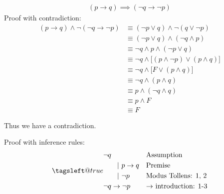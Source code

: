 \documentclass[11pt]{article}
\makeatletter
\newcommand{\leqnomode}{\tagsleft@true}
\newcommand{\tab}[1][30pt]{\hspace*{#1}}
\newcommand{\subrule}{\tab[20pt]\vert\ }
\makeatother
\begin{document}
\subsubsection{}
\begin{align}
(p\to q) \implies (\neg q \to \neg p)
\end{align}
Proof with contradiction:
\begin{align*}
(p\to q) \land \neg (\neg q \to \neg p) &\equiv (\neg p \lor q) \land \neg (q \lor \neg p)\\
& \equiv (\neg p \lor q) \land (\neg q \land p)\\
& \equiv \neg q \land p \land (\neg p \lor q) \tag{reorder}\\
& \equiv \neg q \land \biggl[(p \land \neg p) \lor (p \land q)\biggr] \tag{Distributive}\\
& \equiv \neg q \land \biggl[F \lor (p \land q)\biggr]\\
& \equiv \neg q \land (p \land q)\\
& \equiv p \land (\neg q \land q) \tag{Associative}\\
& \equiv p \land F\\
& \equiv F
\end{align*}

Thus we have a contradiction.

Proof with inference rules:
\begin{subequations}
\leqnomode
\renewcommand{\theequation}{\arabic{equation}}
\begin{align}
&\neg q &&\textup{Assumption}\\
&\subrule p \to q &&\textup{Premise}\\
&\subrule \neg p &&\textup{Modus Tollens: 1, 2}\\
&\neg q \to \neg p &&\textup{$\to$ introduction: 1-3}
\end{align}
\end{subequations}
\end{document}
